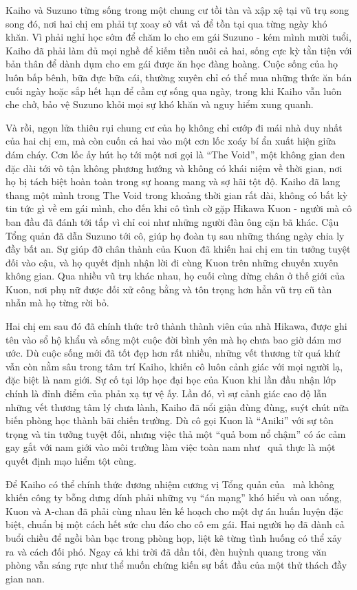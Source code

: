 \documentclass[../main.tex]{subfiles}
\begin{document}
Kaiho và Suzuno từng sống trong một chung cư tồi tàn và xập xệ tại vũ trụ song song đó, nơi hai chị em phải tự xoay sở vất vả để tồn tại qua từng ngày khó khăn. Vì phải nghỉ học sớm để chăm lo cho em gái Suzuno - kém mình mười tuổi, Kaiho đã phải làm đủ mọi nghề để kiếm tiền nuôi cả hai, sống cực kỳ tằn tiện với bản thân để dành dụm cho em gái được ăn học đàng hoàng. Cuộc sống của họ luôn bấp bênh, bữa đực bữa cái, thường xuyên chỉ có thể mua những thức ăn bán cuối ngày hoặc sắp hết hạn để cầm cự sống qua ngày, trong khi Kaiho vẫn luôn che chở, bảo vệ Suzuno khỏi mọi sự khó khăn và nguy hiểm xung quanh.

Và rồi, ngọn lửa thiêu rụi chung cư của họ không chỉ cướp đi mái nhà duy nhất của hai chị em, mà còn cuốn cả hai vào một cơn lốc xoáy bí ẩn xuất hiện giữa đám cháy. Cơn lốc ấy hút họ tới một nơi gọi là ``The Void'', một không gian đen đặc dài tới vô tận không phương hướng và không có khái niệm về thời gian, nơi họ bị tách biệt hoàn toàn trong sự hoang mang và sợ hãi tột độ. Kaiho đã lang thang một mình trong The Void trong khoảng thời gian rất dài, không có bất kỳ tin tức gì về em gái mình, cho đến khi cô tình cờ gặp Hikawa Kuon - người mà cô ban đầu đã đánh tới tấp vì chỉ coi như những người đàn ông cặn bã khác. Cậu Tổng quản đã dẫn Suzuno tới cô, giúp họ đoàn tụ sau những tháng ngày chia ly đầy bất an. Sự giúp đỡ chân thành của Kuon đã khiến hai chị em tin tưởng tuyệt đối vào cậu, và họ quyết định nhận lời đi cùng Kuon trên những chuyến xuyên không gian. Qua nhiều vũ trụ khác nhau, họ cuối cùng dừng chân ở thế giới của Kuon, nơi phụ nữ được đối xử công bằng và tôn trọng hơn hẳn vũ trụ cũ tàn nhẫn mà họ từng rời bỏ.

Hai chị em sau đó đã chính thức trở thành thành viên của nhà Hikawa, được ghi tên vào sổ hộ khẩu và sống một cuộc đời bình yên mà họ chưa bao giờ dám mơ ước. Dù cuộc sống mới đã tốt đẹp hơn rất nhiều, những vết thương từ quá khứ vẫn còn nằm sâu trong tâm trí Kaiho, khiến cô luôn cảnh giác với mọi người lạ, đặc biệt là nam giới. Sự cố tại lớp học đại học của Kuon khi lần đầu nhận lớp chính là đỉnh điểm của phản xạ tự vệ ấy. Lần đó, vì sự cảnh giác cao độ lẫn những vết thương tâm lý chưa lành, Kaiho đã nổi giận đùng đùng, suýt chút nữa biến phòng học thành bãi chiến trường. Dù cô gọi Kuon là ``Aniki'' với sự tôn trọng và tin tưởng tuyệt đối, nhưng việc thả một ``quả bom nổ chậm'' có ác cảm gay gắt với nam giới vào môi trường làm việc toàn nam như \hls\ quả thực là một quyết định mạo hiểm tột cùng.

Để Kaiho có thể chính thức đương nhiệm cương vị Tổng quản của \hls\ mà không khiến công ty bỗng dưng dính phải những vụ ``án mạng'' khó hiểu và oan uổng, Kuon và A-chan đã phải cùng nhau lên kế hoạch cho một dự án huấn luyện đặc biệt, chuẩn bị một cách hết sức chu đáo cho cô em gái. Hai người họ đã dành cả buổi chiều để ngồi bàn bạc trong phòng họp, liệt kê từng tình huống có thể xảy ra và cách đối phó. Ngay cả khi trời đã dần tối, đèn huỳnh quang trong văn phòng vẫn sáng rực như thể muốn chứng kiến sự bắt đầu của một thử thách đầy gian nan.
\end{document}
